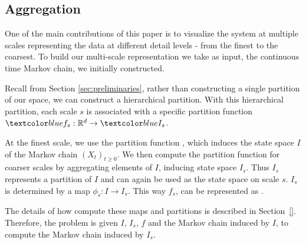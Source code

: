 \subsection{Aggregation}
\label{sec:framework-aggregation}

One of the main contributions of this paper is to visualize the system at multiple scales  representing
the data at different detail levels - from the finest to the coarsest. To build our multi-scale representation we take as input, the continuous time Markov chain, we initially constructed. 

Recall from Section \ref{sec:preliminaries}, rather than constructing a single partition of our space, we can construct a hierarchical partition. With this hierarchical partition,  each scale $s$ is associated with a specific partition
function $\lstopar{f_s}: \mathbb{R}^d \rightarrow \lstopar{I_s}$.

At the finest scale, we use the 
partition function , which induces
the state space $I$ of the Markov chain $(X_t)_{t \ge 0}$. We then compute the partition
function for coarser scales by aggregating elements of $I$, inducing state space $I_s$.
Thus $I_s$ represents a partition of $I$ and can again be used as the state space on scale $s$.
$I_s$ is determined by a map $\phi_s: I \rightarrow I_s$. This
way $f_s$, can be represented as .

The details of how compute these maps and partitions is described in Section~\ref{}. Therefore, the problem is given $I$, $I_s$, $f$ and the Markov chain induced by $I$, to compute the Markov chain induced by $I_s$.

